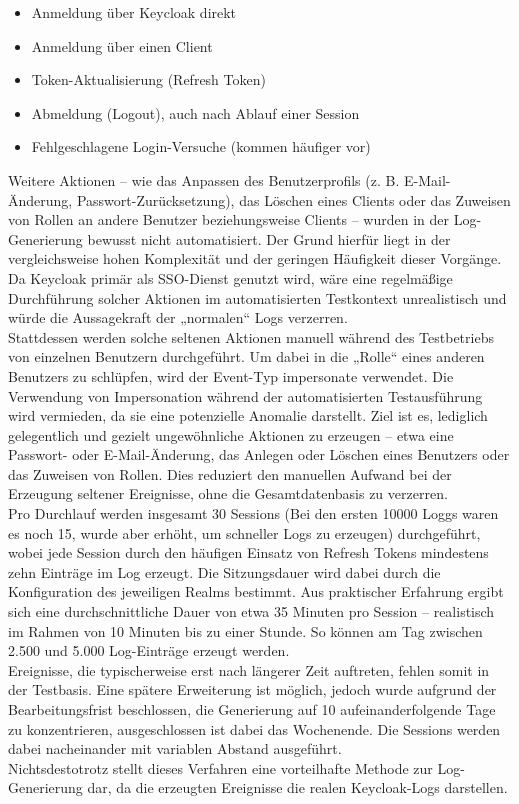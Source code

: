 \documentclass[a4paper,12pt]{article}
\begin{document}
	\begin{itemize}
		\item Anmeldung über Keycloak direkt
		\item Anmeldung über einen Client
		\item Token-Aktualisierung (Refresh Token)
		\item Abmeldung (Logout), auch nach Ablauf einer Session
		\item Fehlgeschlagene Login-Versuche (kommen häufiger vor)
	\end{itemize}
	Weitere Aktionen – wie das Anpassen des Benutzerprofils (z. B. E-Mail-Änderung, Passwort-Zurücksetzung), das Löschen eines Clients oder das Zuweisen von Rollen an andere Benutzer beziehungsweise Clients – wurden in der Log-Generierung bewusst nicht automatisiert. Der Grund hierfür liegt in der vergleichsweise hohen Komplexität und der geringen Häufigkeit dieser Vorgänge. Da Keycloak primär als SSO-Dienst genutzt wird, wäre eine regelmäßige Durchführung solcher Aktionen im automatisierten Testkontext unrealistisch und würde die Aussagekraft der „normalen“ Logs verzerren.
	\\[0.5em]
	Stattdessen werden solche seltenen Aktionen manuell während des Testbetriebs von einzelnen Benutzern durchgeführt. Um dabei in die „Rolle“ eines anderen Benutzers zu schlüpfen, wird der Event-Typ \gls{impersonate} verwendet. Die Verwendung von Impersonation während der automatisierten Testausführung wird vermieden, da sie eine potenzielle Anomalie darstellt. Ziel ist es, lediglich gelegentlich und gezielt ungewöhnliche Aktionen zu erzeugen – etwa eine Passwort- oder E-Mail-Änderung, das Anlegen oder Löschen eines Benutzers oder das Zuweisen von Rollen. Dies reduziert den manuellen Aufwand bei der Erzeugung seltener Ereignisse, ohne die Gesamtdatenbasis zu verzerren.
	\\[0.5em]
	Pro Durchlauf werden insgesamt 30 Sessions (Bei den ersten 10000 Loggs waren es noch 15, wurde aber erhöht, um schneller Logs zu erzeugen) durchgeführt, wobei jede Session durch den häufigen Einsatz von Refresh Tokens mindestens zehn Einträge im Log erzeugt. Die Sitzungsdauer wird dabei durch die Konfiguration des jeweiligen Realms bestimmt. Aus praktischer Erfahrung ergibt sich eine durchschnittliche Dauer von etwa 35 Minuten pro Session – realistisch im Rahmen von 10 Minuten bis zu einer Stunde. So können am Tag zwischen 2.500 und 5.000 Log-Einträge erzeugt werden.
	\\[0.5em]
	Ereignisse, die typischerweise erst nach längerer Zeit auftreten, fehlen somit in der Testbasis. Eine spätere Erweiterung ist möglich, jedoch wurde aufgrund der Bearbeitungsfrist beschlossen, die Generierung auf 10 aufeinanderfolgende Tage zu konzentrieren, ausgeschlossen ist dabei das Wochenende. Die Sessions werden dabei nacheinander mit variablen Abstand ausgeführt.
	\\[0.5em]
	Nichtsdestotrotz stellt dieses Verfahren eine vorteilhafte Methode zur Log-Generierung dar, da die erzeugten Ereignisse die realen Keycloak-Logs darstellen.
		
\end{document}
